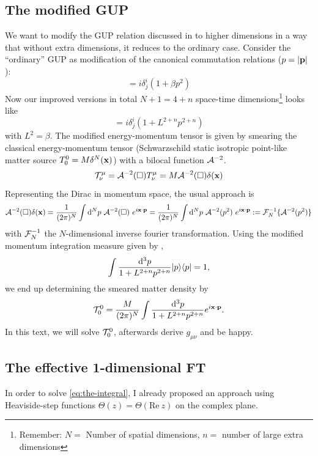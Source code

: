 \documentclass[10pt,a4paper]{article}
\begin{document}
\subsection{The modified GUP}
We want to modify the GUP relation discussed in \cite{isi2013} to higher dimensions in a way that without
extra dimensions, it reduces to the ordinary case. Consider the ``ordinary'' GUP as modification of the canonical commutation relations ($p=|\mathbf{ p }|$):
%
\begin{equation}
[x^i, p_j] = i \delta^i_j (1 + \beta p^2)
\end{equation}
%
Now our improved versions in total $N+1=4+n$ space-time dimensions\footnote{Remember: $N=$ Number of spatial dimensions, $n=$ number of large extra dimensions} looks like
\begin{equation}
[x^i, p_j] = i \delta^i_j (1 + L^{2+n} p^{2+n})
\end{equation}
%
with $L^2=\beta$. The modified energy-momentum tensor is given by smearing the classical energy-momentum tensor 
(Schwarzschild static isotropic point-like matter source $T^0_0 = M\delta^N(\mathbf{ x })$) with a bilocal function ${\cal A}^{-2}$.
\begin{equation}
{\cal T}^\mu_\nu = {\cal A}^{-2}(\square) T^\mu_\nu = M {\cal A}^{-2}(\square) \delta(\mathbf{ x })
\end{equation}
Representing the Dirac in momentum space, the usual approach is
\begin{equation}
{\cal A}^{-2}(\square) \delta(\mathbf{ x }) =
\frac{1}{(2\pi)^N}
\int \mathrm{d}^N p~{\cal A}^{-2}(\square)~e^{i \mathbf{ x } \cdot \mathbf{ p }}
=
\frac{1}{(2\pi)^N}
\int \mathrm{d}^N p~{\cal A}^{-2}(p^2)~e^{i \mathbf{ x } \cdot \mathbf{ p }}
:= {\cal F}_N^{-1} \{ {\cal A}^{-2}(p^2) \}
\end{equation}
with ${\cal F}^{-1}_N$ the $N$-dimensional inverse fourier transformation. Using the modified momentum integration measure given by \cite{kempf1995},
\begin{equation}
\int \frac{\mathrm{d}^3 p}{1 + L^{2+n} p^{2+n}} | p \rangle\langle p | = 1,
\end{equation}
we end up determining the smeared matter density by
\begin{equation}\label{eq:the-integral}
{\cal T}^0_0 = \frac{M}{(2\pi)^N}
\int \frac{\mathrm{d}^3 p}{1 + L^{2+n} p^{2+n}} e^{i \mathbf{ x } \cdot \mathbf{ p }}.
\end{equation}
In this text, we will solve ${\cal T}^0_0$, afterwards derive $g_{\mu\nu}$ and be happy.

\subsection{The effective 1-dimensional FT}
In order to solve \eqref{eq:the-integral}, I already proposed an approach using
Heaviside-step functions  $\Theta(z)=\Theta(\text{Re}~z)$ on the complex plane.
\end{document}
